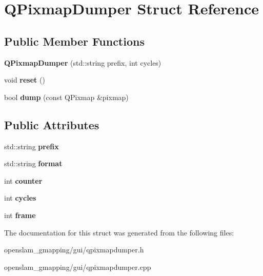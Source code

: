 \hypertarget{structQPixmapDumper}{}\section{Q\+Pixmap\+Dumper Struct Reference}
\label{structQPixmapDumper}
\subsection*{Public Member Functions}
\begin{DoxyCompactItemize}
\item 
\mbox{\label{structQPixmapDumper_a0582082dac19123ade3653bb21c87318}} 
{\bfseries Q\+Pixmap\+Dumper} (std\+::string prefix, int cycles)
\item 
\mbox{\label{structQPixmapDumper_a8127cdb6e26bc4f132283bbf1f880ede}} 
void {\bfseries reset} ()
\item 
\mbox{\label{structQPixmapDumper_ab8d4d8686a3ffe09e25455cd63bfe224}} 
bool {\bfseries dump} (const Q\+Pixmap \&pixmap)
\end{DoxyCompactItemize}
\subsection*{Public Attributes}
\begin{DoxyCompactItemize}
\item 
\mbox{\label{structQPixmapDumper_a0fc12a413382ca0b4762ea398cfda161}} 
std\+::string {\bfseries prefix}
\item 
\mbox{\label{structQPixmapDumper_a747d5fa0d173b25865adadd69affde28}} 
std\+::string {\bfseries format}
\item 
\mbox{\label{structQPixmapDumper_a2f949aa54ebffaf3cc05f4795cdff504}} 
int {\bfseries counter}
\item 
\mbox{\label{structQPixmapDumper_a2eb49206de9bd7ef848388e5a4d9032f}} 
int {\bfseries cycles}
\item 
\mbox{\label{structQPixmapDumper_a4a16600398af581bab929f048a2a5cd3}} 
int {\bfseries frame}
\end{DoxyCompactItemize}


The documentation for this struct was generated from the following files\+:\begin{DoxyCompactItemize}
\item 
openslam\+\_\+gmapping/gui/qpixmapdumper.\+h\item 
openslam\+\_\+gmapping/gui/qpixmapdumper.\+cpp\end{DoxyCompactItemize}
